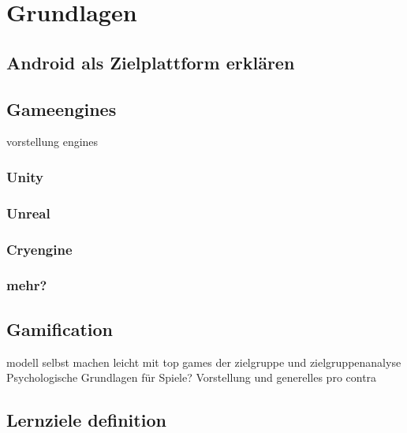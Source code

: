 \section{Grundlagen}
\subsection{Android als Zielplattform erklären}
\subsection{Gameengines}
	vorstellung engines
	\subsubsection{Unity}
	\subsubsection{Unreal}
	\subsubsection{Cryengine}
	\subsubsection{mehr?}
\subsection{Gamification}
	modell selbst machen leicht mit top games der zielgruppe und zielgruppenanalyse
	Psychologische Grundlagen für Spiele?
	Vorstellung und generelles pro contra
\subsection{Lernziele definition}
